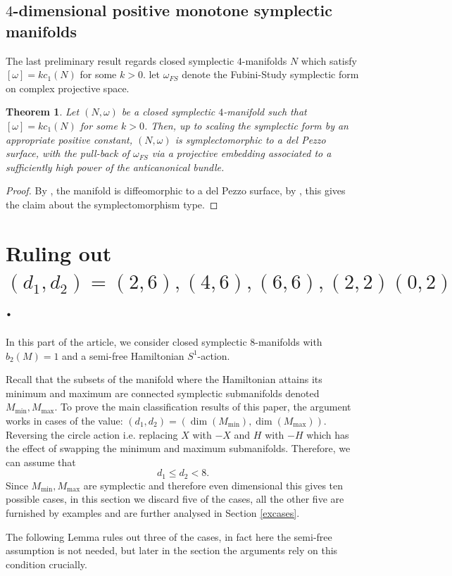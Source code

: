 \documentclass[12pt]{article}
\newtheorem{theorem}{Theorem}[section]
\begin{document}
\subsection{$4$-dimensional positive monotone symplectic manifolds}
The last preliminary result regards closed symplectic $4$-manifolds $N$ which satisfy $[\omega] = k c_{1}(N)$ for some $k > 0$. let $\omega_{FS}$ denote the Fubini-Study symplectic form on complex projective space.

\begin{theorem} \label{projectiveplanetheorem} \cite{OO}
Let $(N,\omega)$ be a closed symplectic $4$-manifold such that $[\omega] = k c_{1}(N)$ for some $k > 0$. Then, up to scaling the symplectic form by an appropriate positive constant, $(N,\omega)$ is symplectomorphic to a del Pezzo surface, with the pull-back of $\omega_{FS}$ via a projective embedding associated to a sufficiently high power of the anticanonical bundle.
\end{theorem}
\begin{proof} By \cite{OO}, the manifold is diffeomorphic to a del Pezzo surface, by \cite[Conclusion. Page 10]{S}, this gives the claim about the symplectomorphism type.
\end{proof}

 \section{Ruling out  $(d_1,d_2) = (2,6),(4,6), (6,6),(2,2)(0,2)$. } \label{rulingout}
In this part of the article, we consider closed symplectic $8$-manifolds with $b_{2}(M)=1$ and a semi-free Hamiltonian $S^1$-action.


 Recall that the subsets of the manifold where the Hamiltonian attains its minimum and maximum are connected symplectic submanifolds denoted $M_{\min},M_{\max}$. To prove the main classification results of this paper, the argument works in cases of the value: $(d_{1},d_{2}) = (\dim(M_{\min}),\dim(M_{\max}))$. Reversing the circle action i.e. replacing $X$ with $-X$ and $H$ with $-H$ which has the effect of swapping the minimum and maximum submanifolds. Therefore, we can assume that $$d_1 \leq d_2 < 8.$$ Since $M_{\min},M_{\max}$ are symplectic and therefore even dimensional this gives ten possible cases, in this section we discard five of the cases, all the other five are furnished by examples and are further analysed in Section \ref{excases}.

The following Lemma rules out three of the cases, in fact here the semi-free assumption is not needed, but later in the section the arguments rely on this condition crucially.
\end{document}
